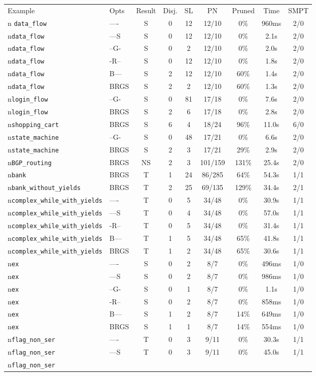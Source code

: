 \begin{tabular}{llccccccc}
\toprule
Example & Opts & Result & Disj. & SL & PN & Pruned & Time & SMPT \\n\midrule
\texttt{data\_flow} & ---- & S & 0 & 12 & 12/10 & 0\% & 960ms & 2/0 \\n\texttt{data\_flow} & ---S & S & 0 & 12 & 12/10 & 0\% & 2.1s & 2/0 \\n\texttt{data\_flow} & --G- & S & 0 & 2 & 12/10 & 0\% & 2.0s & 2/0 \\n\texttt{data\_flow} & -R-- & S & 0 & 12 & 12/10 & 0\% & 1.8s & 2/0 \\n\texttt{data\_flow} & B--- & S & 2 & 12 & 12/10 & 60\% & 1.4s & 2/0 \\n\texttt{data\_flow} & BRGS & S & 2 & 2 & 12/10 & 60\% & 1.3s & 2/0 \\n\texttt{login\_flow} & --G- & S & 0 & 81 & 17/18 & 0\% & 7.6s & 2/0 \\n\texttt{login\_flow} & BRGS & S & 2 & 6 & 17/18 & 0\% & 2.8s & 2/0 \\n\texttt{shopping\_cart} & BRGS & S & 6 & 4 & 18/24 & 96\% & 11.0s & 6/0 \\n\texttt{state\_machine} & --G- & S & 0 & 48 & 17/21 & 0\% & 6.6s & 2/0 \\n\texttt{state\_machine} & BRGS & S & 2 & 3 & 17/21 & 29\% & 2.9s & 2/0 \\n\texttt{BGP\_routing} & BRGS & NS & 2 & 3 & 101/159 & 131\% & 25.4s & 2/0 \\n\texttt{bank} & BRGS & T & 1 & 24 & 86/285 & 64\% & 54.3s & 1/1 \\n\texttt{bank\_without\_yields} & BRGS & T & 2 & 25 & 69/135 & 129\% & 34.4s & 2/1 \\n\texttt{complex\_while\_with\_yields} & ---- & T & 0 & 5 & 34/48 & 0\% & 30.9s & 1/1 \\n\texttt{complex\_while\_with\_yields} & ---S & T & 0 & 4 & 34/48 & 0\% & 57.0s & 1/1 \\n\texttt{complex\_while\_with\_yields} & -R-- & T & 0 & 5 & 34/48 & 0\% & 31.4s & 1/1 \\n\texttt{complex\_while\_with\_yields} & B--- & T & 1 & 5 & 34/48 & 65\% & 41.8s & 1/1 \\n\texttt{complex\_while\_with\_yields} & BRGS & T & 1 & 2 & 34/48 & 65\% & 30.6s & 1/1 \\n\texttt{ex} & ---- & S & 0 & 2 & 8/7 & 0\% & 496ms & 1/0 \\n\texttt{ex} & ---S & S & 0 & 2 & 8/7 & 0\% & 986ms & 1/0 \\n\texttt{ex} & --G- & S & 0 & 1 & 8/7 & 0\% & 1.1s & 1/0 \\n\texttt{ex} & -R-- & S & 0 & 2 & 8/7 & 0\% & 858ms & 1/0 \\n\texttt{ex} & B--- & S & 1 & 2 & 8/7 & 14\% & 649ms & 1/0 \\n\texttt{ex} & BRGS & S & 1 & 1 & 8/7 & 14\% & 554ms & 1/0 \\n\texttt{flag\_non\_ser} & ---- & T & 0 & 3 & 9/11 & 0\% & 30.3s & 1/1 \\n\texttt{flag\_non\_ser} & ---S & T & 0 & 3 & 9/11 & 0\% & 45.0s & 1/1 \\n\texttt{flag\_non\_ser} & 
\end{tabular}
